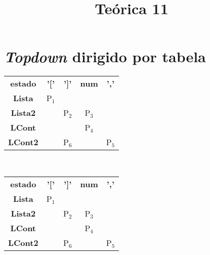 \documentclass{article}
\begin{document}
\title{Teórica 11}
\maketitle
\section{\textit{Topdown} dirigido por tabela}
\begin{tabular}{c c c c c}
	\textbf{estado} & \textbf{'['} & \textbf{']'} & \textbf{num} & \textbf{','} \\ 
	\textbf{Lista} & P$_{1}$ &  &  &  \\ 
	\textbf{Lista2} &  & P$_{2}$ & P$_{3}$ &  \\ 
	\textbf{LCont} &  &  & P$_{4}$ &  \\ 
	\textbf{LCont2} &  & P$_{6}$ &  & P$_{5}$ \\ 
\end{tabular}
\\
 \begin{tabular}{c c c c c}
	\textbf{estado} & \textbf{'['} & \textbf{']'} & \textbf{num} & \textbf{','} \\ 
	\textbf{Lista} & P$_{1}$ &  &  &  \\ 
	\textbf{Lista2} &  & P$_{2}$ & P$_{3}$ &  \\ 
	\textbf{LCont} &  &  & P$_{4}$ &  \\ 
	\textbf{LCont2} &  & P$_{6}$ &  & P$_{5}$ \\ 
\end{tabular}
\end{document}
